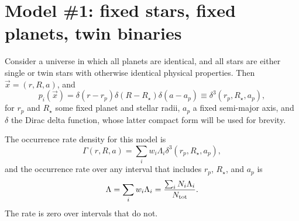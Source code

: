 \section{Model \#1: fixed stars, fixed planets, twin binaries}
\label{sec:model_1}

Consider a universe in which all planets are identical, and all stars are 
either single or twin stars with otherwise identical physical properties.
Then $\vec{x} = (r,R,a)$, and 
\begin{equation}
p_i(\vec{x})= \delta(r-r_p)\delta(R-R_\star)\delta(a-a_p)
\equiv \delta^3(r_p,R_\star,a_p),
\label{eq:model_1_prob}
\end{equation}
for $r_p$ and $R_\star$ some fixed planet and stellar radii, $a_p$ a fixed 
semi-major axis, and $\delta$ the Dirac delta function, whose latter compact 
form will be used for brevity.

The occurrence rate density for this model is
\begin{equation}
\Gamma(r,R,a) = \sum_i w_i \Lambda_i \delta^3(r_p,R_\star,a_p),
\label{eq:model1_occ_rate_density}
\end{equation}
and the occurrence rate over any interval that includes $r_p$, $R_\star$, and 
$a_p$ is
\begin{equation}
\Lambda = \sum_i w_i \Lambda_i = \frac{ \sum_i N_i \Lambda_i }{N_{\rm tot}}.
\end{equation}
The rate is zero over intervals that do not.

